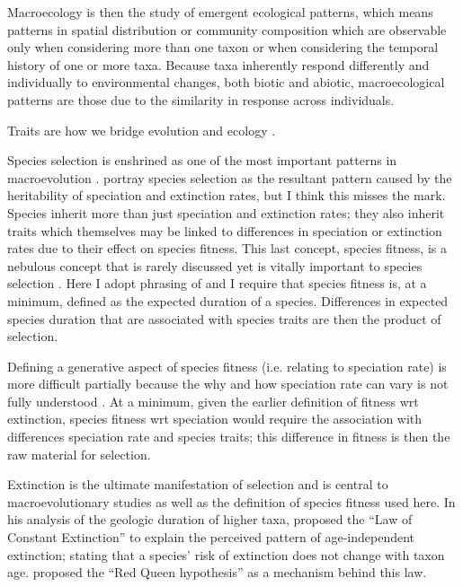 Macroecology is then the study of emergent ecological patterns, which means patterns in spatial distribution or community composition which are observable only when considering more than one taxon or when considering the temporal history of one or more taxa. Because taxa inherently respond differently and individually to environmental changes, both biotic and abiotic, macroecological patterns are those due to the similarity in response across individuals.


Traits are how we bridge evolution and ecology \citep{Mcgill2006,Webber2017}.


Species selection is enshrined as one of the most important patterns in macroevolution \citep{Stanley1975,Stanley1979,Vrba1986,Jablonski2008a,Rabosky2010b,Simpson2016a,Pennell2014}. \citet{Rabosky2010b} portray species selection as the resultant pattern caused by the heritability of speciation and extinction rates, but I think this misses the mark. Species inherit more than just speciation and extinction rates; they also inherit traits which themselves may be linked to differences in speciation or extinction rates due to their effect on species fitness. This last concept, species fitness, is a nebulous concept that is rarely discussed yet is vitally important to species selection \citep{Cooper1984,Palmer2012}. Here I adopt phrasing of \citet{Cooper1984} and I require that species fitness is, at a minimum, defined as the expected duration of a species. Differences in expected species duration that are associated with species traits are then the product of selection.

Defining a generative aspect of species fitness (i.e. relating to speciation rate) is more difficult partially because the why and how speciation rate can vary is not fully understood \citep{Rabosky2015c,Rabosky2013e}. At a minimum, given the earlier definition of fitness wrt extinction, species fitness wrt speciation would require the association with differences speciation rate and species traits; this difference in fitness is then the raw material for selection.

Extinction is the ultimate manifestation of selection and is central to macroevolutionary studies as well as the definition of species fitness used here. In his analysis of the geologic duration of higher taxa, \citet{VanValen1973} proposed the ``Law of Constant Extinction'' to explain the perceived pattern of age-independent extinction; stating that a species' risk of extinction does not change with taxon age. \citet{VanValen1973} proposed the ``Red Queen hypothesis'' as a mechanism behind this law.

